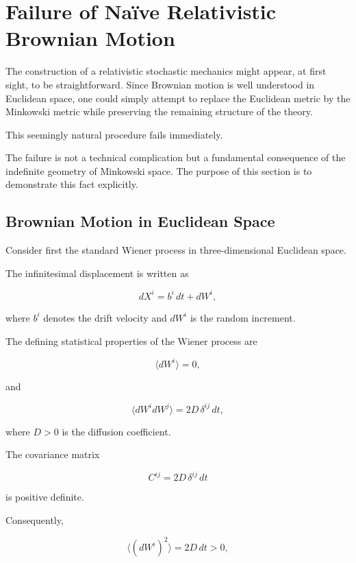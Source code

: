 \section{Failure of Na\"ive Relativistic Brownian Motion}

The construction of a relativistic stochastic mechanics might appear, at
first sight, to be straightforward. Since Brownian motion is well
understood in Euclidean space, one could simply attempt to replace the
Euclidean metric by the Minkowski metric while preserving the remaining
structure of the theory.

This seemingly natural procedure fails immediately.

The failure is not a technical complication but a fundamental
consequence of the indefinite geometry of Minkowski space. The purpose of
this section is to demonstrate this fact explicitly.

\subsection{Brownian Motion in Euclidean Space}

Consider first the standard Wiener process in three-dimensional
Euclidean space.

The infinitesimal displacement is written as

\[
dX^i=b^i\,dt+dW^i ,
\]

where \(b^i\) denotes the drift velocity and \(dW^i\) is the random
increment.

The defining statistical properties of the Wiener process are

\[
\langle dW^i\rangle =0,
\]

and

\[
\langle dW^i dW^j\rangle
=
2D\,\delta^{ij}\,dt ,
\]

where \(D>0\) is the diffusion coefficient.

The covariance matrix

\[
C^{ij}
=
2D\,\delta^{ij}\,dt
\]

is positive definite.

Consequently,

\[
\langle (dW^i)^2\rangle
=
2D\,dt
>
0,
\]

